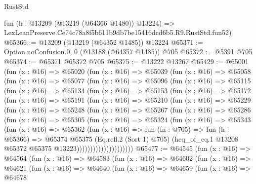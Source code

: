 \begin{lexlean}{RustStd}
\begin{coremodule}
    fun (h : @13209 (@13219 (@64366 @1480)) @13224) =>
    LexLeanPreserve.Ce74c78a8f5b611b9db7be15416dcd6b5.R9.RustStd.fun52)
@65366 := @13209 (@13219 (@64352 @1485)) @13224
@65371 := Option.noConfusion.{0, 0} (@13188 (@64357 @1485)) @705
@65372 := @5391 @705
@65374 := @65371 @65372 @705
@65375 := @13222 @13267
@65429 := @65001
    (fun (x : @16) =>
    @65020
      (fun (x : @16) =>
      @65039
        (fun (x : @16) =>
        @65058
          (fun (x : @16) =>
          @65077
            (fun (x : @16) =>
            @65096
              (fun (x : @16) =>
              @65115
                (fun (x : @16) =>
                @65134
                  (fun (x : @16) =>
                  @65153
                    (fun (x : @16) =>
                    @65172
                      (fun (x : @16) =>
                      @65191
                        (fun (x : @16) =>
                        @65210
                          (fun (x : @16) =>
                          @65229
                            (fun (x : @16) =>
                            @65248
                              (fun (x : @16) =>
                              @65267
                                (fun (x : @16) =>
                                @65286
                                  (fun (x : @16) =>
                                  @65305
                                    (fun (x : @16) =>
                                    @65324
                                      (fun (x : @16) =>
                                      @65343
                                        (fun (x : @16) =>
                                        @65362
                                          (fun (x : @16) =>
                                          fun (fn : @705) =>
                                          fun (h : @65366) =>
                                          @65374
                                            @65375
                                            (Eq.refl.{2} (Sort 1) @705)
                                            (heq_of_eq.{1}
                                              @13208
                                              @65372
                                              @65375
                                              @13223)))))))))))))))))))))
@65477 := @64545
    (fun (x : @16) =>
    @64564
      (fun (x : @16) =>
      @64583
        (fun (x : @16) =>
        @64602
          (fun (x : @16) =>
          @64621
            (fun (x : @16) =>
            @64640
              (fun (x : @16) =>
              @64659
                (fun (x : @16) =>
                @64678

\end{coremodule}
\end{lexlean}
